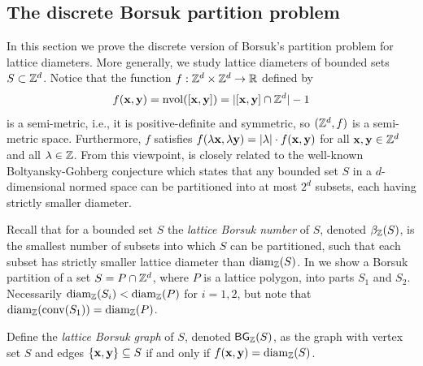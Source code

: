 \subsection{The discrete Borsuk partition problem}\label{sec:2.4}

In this section we prove the discrete version of Borsuk's partition problem for lattice diameters. More generally, we study lattice diameters of bounded sets $S \subset \mathbb{Z}^d$. 
Notice that the function $f : \mathbb{Z}^d \times \mathbb{Z}^d \to \mathbb{R}$ defined by  
\[
f(\mathbf{x}, \mathbf{y}) = \operatorname{nvol}([\mathbf{x}, \mathbf{y}]) = |[\mathbf{x}, \mathbf{y}] \cap \mathbb{Z}^d| - 1
\]  
    is a semi-metric, i.e., it is positive-definite and symmetric, so $(\mathbb{Z}^d, f)$ is a semi-metric space. Furthermore, $f$ satisfies $f(\lambda \mathbf{x}, \lambda \mathbf{y}) = |\lambda| \cdot f(\mathbf{x},\mathbf{y})$ for all $\mathbf{x},\mathbf{y} \in \mathbb{Z}^d$ and all $\lambda \in \mathbb{Z}$. From this viewpoint,  is closely related to the well-known Boltyansky-Gohberg conjecture \cite{boltjansky1985results} which states that any bounded set $S$ in a $d$-dimensional normed space can be partitioned into at most $2^d$ subsets, each having strictly smaller diameter.

Recall that for a bounded set $S$ the \emph{lattice Borsuk number} of $S$, denoted $\beta_{\mathbb{Z}}(S)$, is the smallest number of subsets into which $S$ can be partitioned, such that each subset has strictly smaller lattice diameter than $\operatorname{diam}_{\mathbb{Z}} (S)$. In \mbox{} we show a Borsuk partition of a set $S=P \cap \mathbb{Z}^d$, where $P$ is a lattice polygon, into parts $S_1$ and $S_2$. Necessarily $\operatorname{diam_{\mathbb{Z}}}(S_i)< \operatorname{diam_{\mathbb{Z}}}(P)$ for $i=1,2$, but 
note that $\operatorname{diam_{\mathbb{Z}}} (\operatorname{conv} (S_1)) = \operatorname{diam_{\mathbb{Z}}}(P)$.


%     

Define the \emph{lattice Borsuk graph} of $S$, denoted $\operatorname{\mathsf{BG}}_{\mathbb{Z}}(S)$, as the graph with vertex set $S$ and edges $\{\mathbf{x},\mathbf{y}\} \subseteq S$ if and only if $f(\mathbf{x},\mathbf{y})=\operatorname{diam}_{\mathbb{Z}}(S)$.

